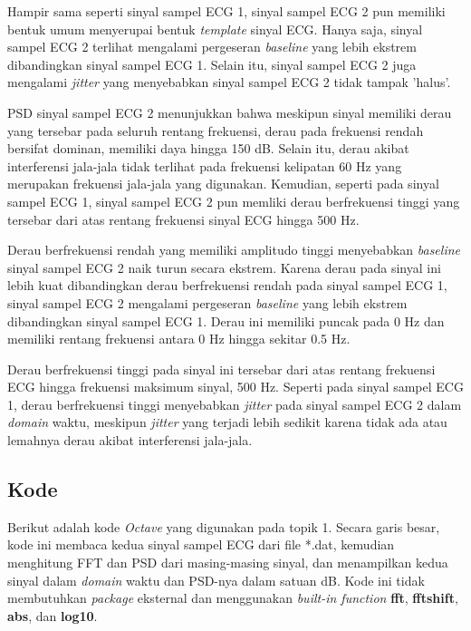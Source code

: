 \documentclass[11pt]{article}
\begin{document}
Hampir sama seperti sinyal sampel ECG 1, sinyal sampel ECG 2 pun memiliki bentuk umum menyerupai bentuk \textit{template} sinyal ECG. Hanya saja, sinyal sampel ECG 2 terlihat mengalami pergeseran \textit{baseline} yang lebih ekstrem dibandingkan sinyal sampel ECG 1. Selain itu, sinyal sampel ECG 2 juga mengalami \textit{jitter} yang menyebabkan sinyal sampel ECG 2 tidak tampak 'halus'.

PSD sinyal sampel ECG 2 menunjukkan bahwa meskipun sinyal memiliki derau yang tersebar pada seluruh rentang frekuensi, derau pada frekuensi rendah bersifat dominan, memiliki daya hingga 150 dB. Selain itu, derau akibat interferensi jala-jala tidak terlihat pada frekuensi kelipatan 60 Hz yang merupakan frekuensi jala-jala yang digunakan. Kemudian, seperti pada sinyal sampel ECG 1, sinyal sampel ECG 2 pun memliki derau berfrekuensi tinggi yang tersebar dari atas rentang frekuensi sinyal ECG hingga 500 Hz.

Derau berfrekuensi rendah yang memiliki amplitudo tinggi menyebabkan \textit{baseline} sinyal sampel ECG 2 naik turun secara ekstrem. Karena derau pada sinyal ini lebih kuat dibandingkan derau berfrekuensi rendah pada sinyal sampel ECG 1, sinyal sampel ECG 2 mengalami pergeseran \textit{baseline} yang lebih ekstrem dibandingkan sinyal sampel ECG 1. Derau ini memiliki puncak pada 0 Hz dan memiliki rentang frekuensi antara 0 Hz hingga sekitar 0.5 Hz.

Derau berfrekuensi tinggi pada sinyal ini tersebar dari atas rentang frekuensi ECG hingga frekuensi maksimum sinyal, 500 Hz. Seperti pada sinyal sampel ECG 1, derau berfrekuensi tinggi menyebabkan \textit{jitter} pada sinyal sampel ECG 2 dalam \textit{domain} waktu, meskipun \textit{jitter} yang terjadi lebih sedikit karena tidak ada atau lemahnya derau akibat interferensi jala-jala.

\subsection{Kode}

Berikut adalah kode \textit{Octave} yang digunakan pada topik 1. Secara garis besar, kode ini membaca kedua sinyal sampel ECG dari file *.dat, kemudian menghitung FFT dan PSD dari masing-masing sinyal, dan menampilkan kedua sinyal dalam \textit{domain} waktu dan PSD-nya dalam satuan dB. Kode ini tidak membutuhkan \textit{package} eksternal dan menggunakan \textit{built-in function} \textbf{fft}, \textbf{fftshift}, \textbf{abs}, dan \textbf{log10}.
\end{document}
